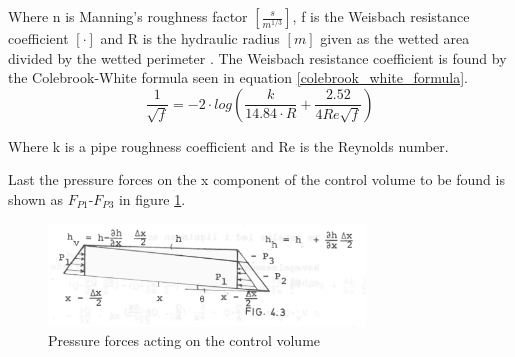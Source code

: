 Where n is Manning's roughness factor $[ \frac{s}{m^{1/3}} ]$, f is the Weisbach resistance coefficient $[\cdot]$ and R is the hydraulic radius $[m]$ given as the wetted area divided by the wetted perimeter \cite{stormwatercollectionsystems}.
The Weisbach resistance coefficient is found by the Colebrook-White formula seen in equation \ref{colebrook_white_formula}.
\begin{equation}
\frac{1}{\sqrt{f}} = -2\cdot log \left( \frac{k}{14.84 \cdot R}+ \frac{2.52}{4 Re \sqrt{f}} \right)
\label{colebrook_white_formula}
\end{equation}

Where k is a pipe roughness coefficient and Re is the Reynolds number.

Last the pressure forces on the x component of the control volume to be found is shown as $F_{P1}$-$F_{P3}$ in figure \ref{fig:forces_on_CV}. 

\begin{figure}[H]
\centering
\includegraphics[width=0.75\textwidth]{report/modeling/pictures/palle_fig}
\caption{Pressure forces acting on the control volume }
\label{fig:forces_on_CV}
\end{figure}

